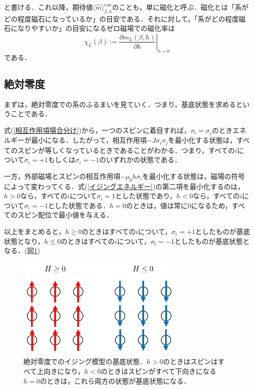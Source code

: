 \documentclass[a4paper,11pt]{jsreport}
\begin{document}
と書ける．これ以降，期待値$\langle \hat{m} \rangle_{\beta, h}^{\text{can}}$のことも，単に磁化と呼ぶ．磁化とは「系がどの程度磁石になっているか」の目安である．それに対して，「系がどの程度磁石になりやすいか」の目安になるゼロ磁場での磁化率は
\begin{equation}
  \chi_L(\beta) := \left.\frac{\partial m_L(\beta, h)}{\partial h}\right|_{h=0}
\end{equation}
である．
\subsection{絶対零度}
まずは，絶対零度での系のふるまいを見ていく．つまり，基底状態を求めるということである．\par
式(\ref{相互作用項場合分け})から，一つのスピンに着目すれば，$\sigma_i = \sigma_j$のときエネルギーが最小になる．したがって，相互作用項$-J\sigma_i \sigma_j$を最小化する状態は，すべてのスピンが等しくなっているときであることがわかる．つまり，すべての$i$について$\sigma_i = +1$もしくは$\sigma_i = -1$のいずれかの状態である．\par
一方，外部磁場とスピンの相互作用項$-\mu_0 h \sigma_i$を最小化する状態は，磁場の符号によって変わってくる．式(\ref{イジングエネルギー})の第二項を最小化するのは，$h>0$なら，すべての$i$について$\sigma_i=1$とした状態であり，$h<0$なら，すべての$i$について$\sigma_i=-1$とした状態である．$h=0$のときは，値は常に$0$になるため，すべてのスピン配位で最小値を与える．\par
以上をまとめると，$h \geq 0$のときはすべての$i$について，$\sigma_i=+1$としたものが基底状態となり，$h \leq 0$のときはすべての$i$について，$\sigma_i=-1$としたものが基底状態となる．(図\ref{絶対零度スピン配位})\par
\begin{figure}[H]
  \begin{center}
    \includegraphics[height=5cm]{image/絶対零度スピン配位.png}
    \caption{絶対零度でのイジング模型の基底状態．$h>0$のときはスピンはすべて上向きになり，$h<0$のときはスピンがすべて下向きになる$h=0$のときは，これら両方の状態が基底状態になる． \label{絶対零度スピン配位}}
  \end{center}
\end{figure}
\end{document}
